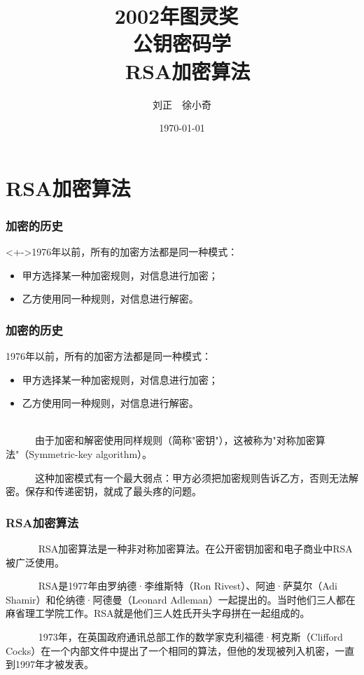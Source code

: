 \documentclass[slidestop,compress,mathserif]{beamer}
\title{2002年图灵奖~\\~公钥密码学~\\~RSA加密算法}
\author{刘正~~徐小奇}
\date{\today}
\begin{document}
\frame{\titlepage}

\section{RSA加密算法}

\begin{frame}
  \frametitle{加密的历史}
  
  \begin{block}<+->{1976年以前，所有的加密方法都是同一种模式：}
    \begin{itemize}[<+->]
        \item 甲方选择某一种加密规则，对信息进行加密；
        \item 乙方使用同一种规则，对信息进行解密。
    \end{itemize}
  \end{block}

\end{frame}

\begin{frame}
  \frametitle{加密的历史}
  
  \begin{block}{1976年以前，所有的加密方法都是同一种模式：}
    \begin{itemize}
        \item 甲方选择某一种加密规则，对信息进行加密；
        \item 乙方使用同一种规则，对信息进行解密。
    \end{itemize}
  \end{block}
  ~\\[0.6cm]

~ ~ ~ ~由于加密和解密使用同样规则（简称"密钥"），这被称为"对称加密算法"（Symmetric-key algorithm）。

~ ~ ~ ~这种加密模式有一个最大弱点：甲方必须把加密规则告诉乙方，否则无法解密。保存和传递密钥，就成了最头疼的问题。
\end{frame}


\begin{frame}
  \frametitle{RSA加密算法}
~ ~ ~ ~ RSA加密算法是一种非对称加密算法。在公开密钥加密和电子商业中RSA被广泛使用。

~ ~ ~ ~ RSA是1977年由罗纳德·李维斯特（Ron Rivest）、阿迪·萨莫尔（Adi Shamir）和伦纳德·阿德曼（Leonard Adleman）一起提出的。当时他们三人都在麻省理工学院工作。RSA就是他们三人姓氏开头字母拼在一起组成的。

~ ~ ~ ~ 1973年，在英国政府通讯总部工作的数学家克利福德·柯克斯（Clifford Cocks）在一个内部文件中提出了一个相同的算法，但他的发现被列入机密，一直到1997年才被发表。

\end{frame}
\end{document}
